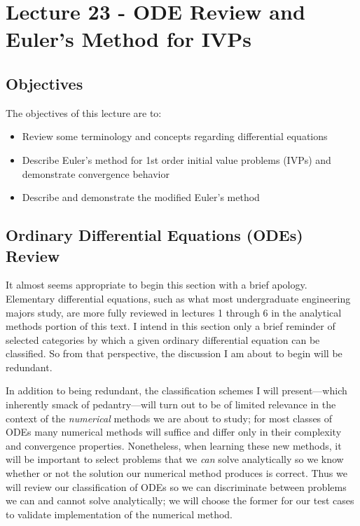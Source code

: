 \chapter{Lecture 23 - ODE Review and Euler's Method for IVPs}
\label{ch:lec23n}
\section{Objectives}
The objectives of this lecture are to:
\begin{itemize}
\item Review some terminology and concepts regarding differential equations
\item Describe Euler's method for 1st order initial value problems (IVPs) and demonstrate convergence behavior
\item Describe and demonstrate the modified Euler's method
\end{itemize}
\setcounter{lstannotation}{0}

\section{Ordinary Differential Equations (ODEs) Review}

It almost seems appropriate to begin this section with a brief apology.  Elementary differential equations, such as what most undergraduate engineering majors study, are more fully reviewed in lectures 1 through 6 in the analytical methods portion of this text.  I intend in this section only a brief reminder of selected categories by which a given ordinary differential equation can be classified.  So from that perspective, the discussion I am about to begin will be redundant.

In addition to being redundant, the classification schemes I will present---which inherently smack of pedantry---will turn out to be of limited relevance in the context of the \emph{numerical} methods we are about to study; for most classes of ODEs many numerical methods will suffice and differ only in their complexity and convergence properties.  Nonetheless, when learning these new methods, it will be important to select problems that we \emph{can} solve analytically so we know whether or not the solution our numerical method produces is correct.  Thus we will review our classification of ODEs so we can discriminate between problems we can and cannot solve analytically; we will choose the former for our test cases to validate implementation of the numerical method.

